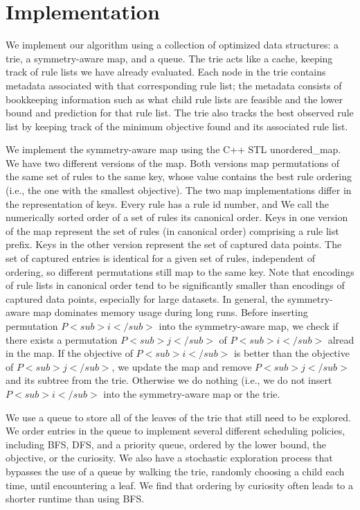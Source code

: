 \section{Implementation}
\label{sec:implementation}

We implement our algorithm using a collection of optimized data structures:
a trie, a symmetry-aware map, and a queue.
The trie acts like a cache, keeping track of rule lists we have already evaluated.
Each node in the trie contains metadata associated with that corresponding rule list;
the metadata consists of bookkeeping information such as what child rule lists are feasible and
the lower bound and prediction for that rule list.
The trie also tracks the best observed rule list by keeping track of the minimum objective
found and its associated rule list.

We implement the symmetry-aware map using the C++ STL unordered\_map.
We have two different versions of the map.
Both versions map permutations of the same set of rules to the same key, whose value
contains the best rule ordering (i.e., the one with the smallest objective).
The two map implementations differ in the representation of keys.
Every rule has a rule id number, and We call the numerically sorted order of a set of rules its
canonical order.
Keys in one version of the map represent the set of rules (in canonical order) comprising a
rule list prefix.
Keys in the other version represent the set of captured data points.
The set of captured entries is identical for a given set of rules, independent of ordering, so
different permutations still map to the same key.
%
Note that encodings of rule lists in canonical order tend to be
significantly smaller than encodings of captured data points,
especially for large datasets.
%
In general, the symmetry-aware map dominates memory usage during long runs.
Before inserting permutation $P<sub>i</sub>$ into the symmetry-aware map, we check
if there exists a permutation $P<sub>j</sub>$ of $P<sub>i</sub>$ alread in the map.
If the objective of $P<sub>i</sub>$ is better than the objective of $P<sub>j</sub>$,
we update the map and remove $P<sub>j</sub>$ and its subtree from the trie.
Otherwise we do nothing (i.e., we do not insert $P<sub>i</sub>$ into the symmetry-aware map
or the trie.

We use a queue to store all of the leaves of the trie that still need to be explored.
We order entries in the queue to implement several different scheduling policies,
including BFS, DFS, and a priority queue, ordered by the lower bound, the objective, or the
curiosity.
We also have a stochastic exploration process that bypasses the use of a queue by walking
the trie, randomly choosing a child each time, until encountering a leaf.
We find that ordering by curiosity often leads to a shorter runtime than using BFS.


